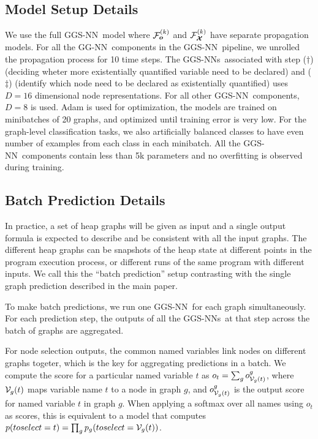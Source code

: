 \documentclass{article} %
\newcommand{\OurMethodMinorShort}{GG-NN}
\newcommand{\OurMethodShort}{GGS-NN}
\newcommand{\OurMethodShorts}{\OurMethodShort s}
\begin{document}
\subsection{Model Setup Details}
We use the full \OurMethodShort~model
where $\mathcal{F}_{\boldsymbol{o}}^{(k)}$ and $\mathcal{F}_{\boldsymbol{\boldsymbol{\mathcal{X}}}}^{(k)}$ have separate propagation models.
For all the \OurMethodMinorShort~components in the \OurMethodShort~pipeline,
we unrolled the propagation process for 10 time steps. The
\OurMethodShorts~associated with step ($\dagger$) (deciding wheter
more existentially quantified variable need to be declared) and ($\ddagger$)
(identify which node need to be declared as existentially quantified) uses
$D=16$ dimensional node representations.  For all other
\OurMethodShort~components, $D=8$ is used.  Adam \citep{kingma2014adam} is
used for optimization, the models are trained on minibatches of 20 graphs, and
optimized until training error is very low. For the graph-level classification tasks, we also
artificially balanced classes to have even number of examples from each class
in each minibatch. All the \OurMethodShort~components contain less than 5k
parameters and no overfitting is observed during training.


\subsection{Batch Prediction Details}
\label{appendix:batch-prediction}

In practice, a set of heap graphs will be given as input and a single output
formula is expected to describe and be consistent with all the input graphs.
The different heap graphs can be snapshots of the heap state at different
points in the program execution process, or different runs of the same program
with different inputs. We call this the ``batch prediction'' setup contrasting
with the single graph prediction described in the main paper.

To make batch predictions, we run one \OurMethodShort~for each graph
simultaneously. For each prediction step, the outputs of all the \OurMethodShorts~at
that step across the batch of graphs are aggregated.

For node selection outputs, the common named
variables link nodes on different graphs togeter, which is the key for
aggregating predictions in a batch.  We compute the score for a particular named
variable $t$ as $o_t = \sum_g o^g_{\mathcal{V}_g(t)}$, where $\mathcal{V}_g(t)$ maps
variable name $t$ to a node in graph $g$, and $o^g_{\mathcal{V}_g(t)}$ is the output score for named
variable $t$ in graph $g$. When applying a softmax over all names using $o_t$
as scores, this is equivalent to a model that computes $p(toselect =
t)=\prod_g p_g(toselect=\mathcal{V}_g(t))$.
\end{document}
